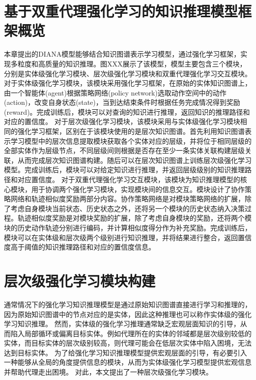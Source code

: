 \documentclass[algorithmlist, AutoFakeBold, AutoFakeSlant, figurelist, tablelist, nomlist, masters]{seuthesix}
\begin{document}
\section{基于双重代理强化学习的知识推理模型框架概览}
本章提出的DIANA模型能够结合知识图谱表示学习模型，通过强化学习框架，实现多粒度和高质量的知识推理。图XXX展示了该模型，模型主要包含三个模块，分别是实体级强化学习模块、层次级强化学习模块和双重代理强化学习交互模块。
对于实体级强化学习模块，该模块采用强化学习框架，在原始的实体知识图谱上，由一个智能体(agent)根据策略网络(policy network)选取动作空间中的动作(action)，改变自身状态(state)，当到达结束条件时根据任务完成情况得到奖励(reward)。完成训练后，模块可以对查询的知识进行推理，返回知识的推理路径和对应的置信度。
对于层次级强化学习模块，该模块采用与实体级强化学习模块相同的强化学习框架，区别在于该模块使用的是层次知识图谱。首先利用知识图谱表示学习模型中的层次信息提取模块获取各个实体对应的层级，并将位于相同层级的全部实体作为层级节点，不同层级间则根据是否存在至少一条实体关联构建层级关联，从而完成层次知识图谱构建。随后可以在层次知识图谱上训练层次级强化学习模型。完成训练后，模块可以对给定知识进行推理，并返回层级级别的知识推理路径和对应置信度。
对于双重代理强化学习交互模块，该模块为知识推理模型的核心模块，用于协调两个强化学习模块，实现模块间的信息交互。模块设计了协作策略网络和轨迹相似度奖励两部分内容。协作策略网络是对模块策略网络的扩展，除了考虑自身模块当前状态、历史状态之外，还将另一个模块的历史状态纳入决策过程。轨迹相似度奖励是对模块奖励的扩展，除了考虑自身模块的奖励，还将两个模块的历史动作轨迹分别进行编码，并计算相似度得分作为补充奖励。完成训练后，模块可以在实体级和层次级两个级别进行知识推理，并将结果进行整合，返回置信度高于阈值的知识推理路径和对应的置信度信息。

\section{层次级强化学习模块构建}
通常情况下的强化学习知识推理模型是通过原始知识图谱直接进行学习和推理的，因为原始知识图谱中的节点对应的是实体，因此这种推理也可以称作实体级的强化学习知识推理。
然而，实体级的强化学习推理通常缺乏宏观层面知识的引导，从而陷入局部循环或偏离目标实体。例如代理所在的实体的邻域都是层次级别较低的实体，而目标实体的层次级别较高，则代理可能会在低层次实体中陷入困境，无法达到目标实体。
为了给强化学习知识推理模型提供宏观层面的引导，有必要引入一种能够从全局的角度提供信息的模块，从而为实体级强化学习模型提供宏观信息并帮助代理走出困境。
对此，本文提出了一种层次级强化学习模块。
\end{document}
